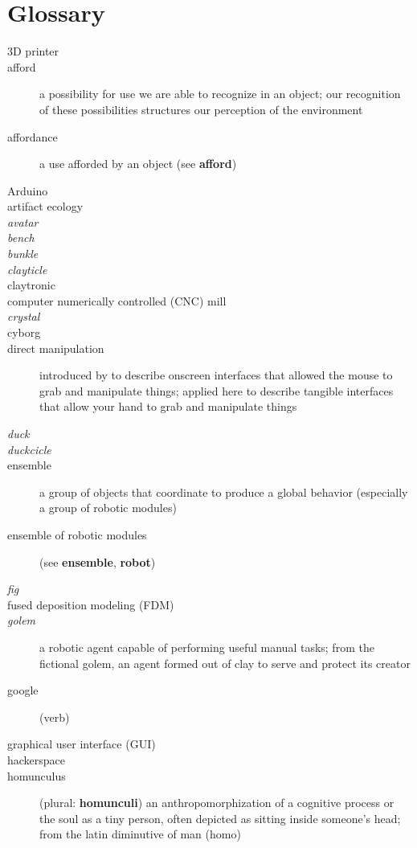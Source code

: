 \chapter{Glossary}
%
\begin{description}
%
\item[3D printer]
%
\item[afford] a possibility for use we are able to recognize in an object; our recognition of these possibilities structures our perception of the environment \citep{gibson_1979}
%
\item[affordance] a use afforded by an object (see {\bf afford})
%
\item[Arduino]
%
\item[artifact ecology]
%
\item[\emph{avatar}]
%
\item[\emph{bench}]
%
\item[\emph{bunkle}]
%
\item[\emph{clayticle}]
%
\item[claytronic]
%
\item[computer numerically controlled (CNC) mill]
%
\item[\emph{crystal}]
%
\item[cyborg]
%
\item[direct manipulation] introduced by \citet{shneiderman_computer1983} to describe onscreen interfaces that allowed the mouse to grab and manipulate things; applied here to describe tangible interfaces that allow your hand to grab and manipulate things
%
\item[\emph{duck}]
%
\item[\emph{duckcicle}]
%
\item[ensemble] a group of objects that coordinate to produce a global behavior (especially a group of robotic modules)
%
\item[ensemble of robotic modules] (see {\bf ensemble}, {\bf robot})
%
\item[\emph{fig}]
%
\item[fused deposition modeling (FDM)]
%
\item[\emph{golem}] a robotic agent capable of performing useful manual tasks; from the fictional golem, an agent formed out of clay to serve and protect its creator
%
\item[google] (verb)
%
\item[graphical user interface (GUI)]
%
\item[hackerspace]
%
\item[homunculus] (plural: {\bf homunculi}) an anthropomorphization of a cognitive process or the soul as a tiny person, often depicted as sitting inside someone's head; from the latin diminutive of man (homo)

\end{description}
